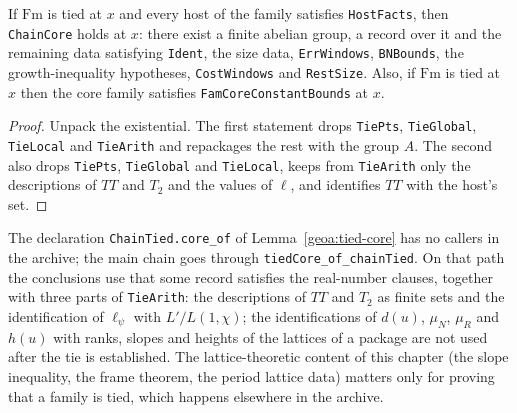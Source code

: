 \begin{lemma}\label{geoa:tied-core}
If $\mathrm{Fm}$ is tied at $x$ and every host of the family satisfies \texttt{HostFacts},
then \texttt{ChainCore} holds at $x$: there exist a finite abelian group, a record over it
and the remaining data satisfying \texttt{Ident}, the size data, \texttt{ErrWindows},
\texttt{BNBounds}, the growth-inequality hypotheses, \texttt{CostWindows} and
\texttt{RestSize}. Also, if $\mathrm{Fm}$ is tied at $x$ then the core family satisfies
\texttt{FamCoreConstantBounds} at $x$.
\end{lemma}
\begin{proof}
Unpack the existential. The first statement drops \texttt{TiePts}, \texttt{TieGlobal},
\texttt{TieLocal} and \texttt{TieArith} and repackages the rest with the group $A$. The
second also drops \texttt{TiePts}, \texttt{TieGlobal} and \texttt{TieLocal}, keeps from
\texttt{TieArith} only the descriptions of $TT$ and $T_2$ and the values of $\ell$, and
identifies $TT$ with the host's set.
\end{proof}

\begin{remark}\label{geoa:rem-ties}
The declaration \texttt{ChainTied.core\_of} of Lemma~\ref{geoa:tied-core} has no
callers in the archive; the main chain goes through \texttt{tiedCore\_of\_chainTied}.
On that path the conclusions use that some record satisfies the real-number clauses,
together with three parts of \texttt{TieArith}: the descriptions of $TT$ and $T_2$ as
finite sets and the identification of $\ell_\psi$ with $L'/L(1,\chi)$; the identifications of $d(u)$, $\mu_N$,
$\mu_R$ and $h(u)$ with ranks, slopes and heights of the lattices of a package are not
used after the tie is established. The lattice-theoretic content of this chapter (the
slope inequality, the frame theorem, the period lattice data) matters only for proving
that a family is tied, which happens elsewhere in the archive.
\end{remark}
